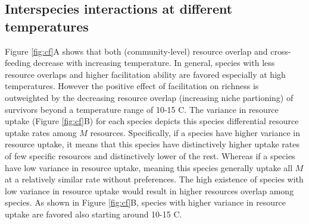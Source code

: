 \documentclass[11pt, a4paper]{article}
\begin{document}
\begin{spacing}{1.5}
\subsection{Interspecies interactions at different temperatures}

Figure \ref{fig:cf}A shows that both (community-level) resource overlap and cross-feeding decrease with increasing temperature. In general, species with less resource overlaps and higher facilitation ability are favored especially at high temperatures. However the positive effect of facilitation on richness is outweighted by the decreasing resource overlap (increasing niche partioning) of survivors beyond a temperature range of 10-15 \textdegree C. The variance in resource uptake (Figure \ref{fig:cf}B) for each species depicts this species differential resource uptake rates among $M$ resources. Specifically, if a species have higher variance in resource uptake, it means that this species have distinctively higher uptake rates of few specific resources and distinctively lower of the rest. Whereas if a species have low variance in resource uptake, meaning this species generally uptake all $M$ at a relatively similar rate without preferences. The high existence of species with low variance in resource uptake would result in higher resources overlap among species. As shown in Figure \ref{fig:cf}B, species with higher variance in resource uptake are favored also starting around 10-15 \textdegree C.


\end{spacing}
\end{document}
